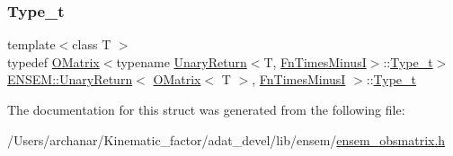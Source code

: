 \subsubsection{\texorpdfstring{Type\_t}{Type\_t}\hspace{0.1cm}{\footnotesize\ttfamily [2/2]}}
{\footnotesize\ttfamily template$<$class T $>$ \\
typedef \mbox{\hyperlink{classENSEM_1_1OMatrix}{O\+Matrix}}$<$typename \mbox{\hyperlink{structENSEM_1_1UnaryReturn}{Unary\+Return}}$<$T, \mbox{\hyperlink{structENSEM_1_1FnTimesMinusI}{Fn\+Times\+MinusI}}$>$\+::\mbox{\hyperlink{structENSEM_1_1UnaryReturn_3_01OMatrix_3_01T_01_4_00_01FnTimesMinusI_01_4_a61e8ab0fd80b071e9277449e6f8bd901}{Type\+\_\+t}}$>$ \mbox{\hyperlink{structENSEM_1_1UnaryReturn}{E\+N\+S\+E\+M\+::\+Unary\+Return}}$<$ \mbox{\hyperlink{classENSEM_1_1OMatrix}{O\+Matrix}}$<$ T $>$, \mbox{\hyperlink{structENSEM_1_1FnTimesMinusI}{Fn\+Times\+MinusI}} $>$\+::\mbox{\hyperlink{structENSEM_1_1UnaryReturn_3_01OMatrix_3_01T_01_4_00_01FnTimesMinusI_01_4_a61e8ab0fd80b071e9277449e6f8bd901}{Type\+\_\+t}}}



The documentation for this struct was generated from the following file\+:\begin{DoxyCompactItemize}
\item 
/\+Users/archanar/\+Kinematic\+\_\+factor/adat\+\_\+devel/lib/ensem/\mbox{\hyperlink{lib_2ensem_2ensem__obsmatrix_8h}{ensem\+\_\+obsmatrix.\+h}}\end{DoxyCompactItemize}
